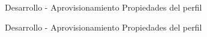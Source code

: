 \begin{frame}{Desarrollo - Aprovisionamiento}
    \vspace{0cm} {Propiedades del perfil}
    \vspace{0cm}
    \begin{figure}[ht]
       \centering
    \end{figure}

\end{frame}

\begin{frame}{Desarrollo - Aprovisionamiento}
    \vspace{0cm} {Propiedades del perfil}
    \vspace{0cm}
    \begin{figure}[ht]
       \centering
    \end{figure}

\end{frame}

